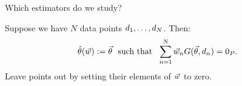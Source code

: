 \begin{frame}[t]{Which estimators do we study?}

Suppose we have $N$ data points $d_{1}, \ldots, d_{N}$.  Then:
%
\begin{align*}
%
\thetahat(\w) :=
\vec\theta \,\, \textrm{ such that } \,\,
\sumn
\w_{n} G(\vec\theta, \d_{n}) =  \zP .
%
\end{align*}
%
{
Leave points out by setting their elements of $\vec{w}$ to zero.
}

%
%
\vspace{1em}
%
\begin{columns}
%
\begin{column}{0.45\linewidth}
\end{column}
%
\begin{column}{0.45\linewidth}
\end{column}
\end{columns}


\end{frame}


